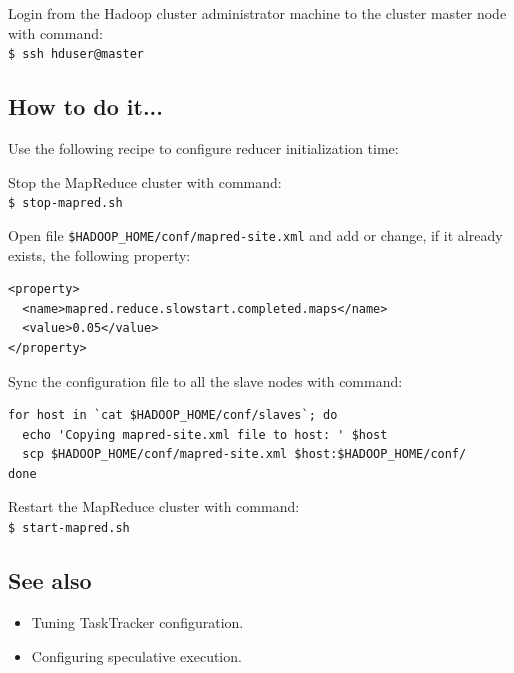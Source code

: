 Login from the Hadoop cluster administrator machine to the cluster master node with command: \\
\verb|$ ssh hduser@master|

\subsection*{How to do it...}
Use the following recipe to configure reducer initialization time:

Stop the MapReduce cluster with command: \\
\verb|$ stop-mapred.sh|

Open file \verb|$HADOOP_HOME/conf/mapred-site.xml| and add or change, if it already exists, the following property:
\lstset{style=bashstyle}
\begin{lstlisting}
<property>
  <name>mapred.reduce.slowstart.completed.maps</name>
  <value>0.05</value>
</property>
\end{lstlisting}

Sync the configuration file to all the slave nodes with command:
\lstset{style=bashstyle}
\begin{lstlisting}
for host in `cat $HADOOP_HOME/conf/slaves`; do
  echo 'Copying mapred-site.xml file to host: ' $host
  scp $HADOOP_HOME/conf/mapred-site.xml $host:$HADOOP_HOME/conf/
done
\end{lstlisting}

Restart the MapReduce cluster with command: \\
\verb|$ start-mapred.sh|

\subsection*{See also}
\begin{itemize}
  \item Tuning TaskTracker configuration.
  \item Configuring speculative execution.
\end{itemize}

